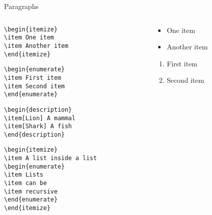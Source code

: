 \begin{frame}[fragile]{Paragraphs}
\begin{columns}
\begin{column}{6cm}
\vspace{-0.3cm}
\begin{lstlisting}
\begin{itemize}
\item One item
\item Another item
\end{itemize}
\end{lstlisting}
\begin{lstlisting}
\begin{enumerate}
\item First item
\item Second item
\end{enumerate}
\end{lstlisting}
\begin{lstlisting}
\begin{description}
\item[Lion] A mammal
\item[Shark] A fish
\end{description}
\end{lstlisting}
\begin{lstlisting}
\begin{itemize}
\item A list inside a list
\begin{enumerate}
\item Lists 
\item can be 
\item recursive
\end{enumerate}
\end{itemize}
\end{lstlisting}
\end{column}
\begin{column}{4cm}
\vspace{-1cm}
\footnotesize
\begin{itemize}
\item One item
\item Another item
\end{itemize}
\vspace{0.5cm}
\begin{enumerate}
\item First item
\item Second item
\end{enumerate}
\vspace{0.5cm}

\end{column}
\end{columns}
\end{frame}
